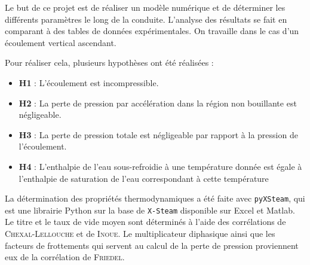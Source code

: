 Le but de ce projet est de réaliser un modèle numérique et de déterminer les différents paramètres le long de la conduite. L'analyse des résultats se fait en comparant à des tables de données expérimentales. On travaille dans le cas d'un écoulement vertical ascendant.\\ \par
Pour réaliser cela, plusieurs hypothèses ont été réalisées :
\begin{itemize}
    \item \textbf{H1} : L'écoulement est incompressible.
    \item \textbf{H2} : La perte de pression par accélération dans la région non bouillante est négligeable.
    \item \textbf{H3} : La perte de pression totale est négligeable par rapport à la pression de l'écoulement.
    \item \textbf{H4} : L'enthalpie de l'eau sous-refroidie à une température donnée est égale à l'enthalpie de saturation de l'eau correspondant à cette température
\end{itemize}
\vspace{12pt}
\par
La détermination des propriétés thermodynamiques a été faite avec \texttt{pyXSteam}, qui est une librairie Python sur la base de \texttt{X-Steam} disponible sur Excel et Matlab.\\
Le titre et le taux de vide moyen sont déterminés à l'aide des corrélations de \textsc{Chexal-Lellouche} et de \textsc{Inoue}. Le multiplicateur diphasique ainsi que les facteurs de frottements qui servent au calcul de la perte de pression proviennent eux de la corrélation de \textsc{Friedel}.\\ \par





